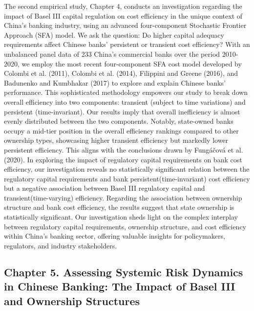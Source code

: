 \documentclass[
  12pt,
  a4paper,
]{scrreprt}
\begin{document}
The second empirical study, Chapter 4, conducts an investigation
regarding the impact of Basel III capital regulation on cost efficiency
in the unique context of China's banking industry, using an advanced
four-component Stochastic Frontier Approach (SFA) model. We ask the
question: Do higher capital adequacy requirements affect Chinese banks'
persistent or transient cost efficiency? With an unbalanced panel data
of 233 China's commercial banks over the period 2010-2020, we employ the
most recent four-component SFA cost model developed by Colombi et al.
(2011), Colombi et al. (2014), Filippini and Greene (2016), and
Badunenko and Kumbhakar (2017) to explore and explain Chinese banks'
performance. This sophisticated methodology empowers our study to break
down overall efficiency into two components: transient (subject to time
variations) and persistent (time-invariant). Our results imply that
overall inefficiency is almost evenly distributed between the two
components. Notably, state-owned banks occupy a mid-tier position in the
overall efficiency rankings compared to other ownership types,
showcasing higher transient efficiency but markedly lower persistent
efficiency. This aligns with the conclusions drawn by Fungáčová et al.
(2020). In exploring the impact of regulatory capital requirements on
bank cost efficiency, our investigation reveals no statistically
significant relation between the regulatory capital requirements and
bank persistent(time-invariant) cost efficiency but a negative
association between Basel III regulatory capital and
transient(time-varying) efficiency. Regarding the association between
ownership structure and bank cost efficiency, the results suggest that
state ownership is statistically significant. Our investigation sheds
light on the complex interplay between regulatory capital requirements,
ownership structure, and cost efficiency within China's banking sector,
offering valuable insights for policymakers, regulators, and industry
stakeholders.

\subsection{Chapter 5. Assessing Systemic Risk Dynamics in Chinese
Banking: The Impact of Basel III and Ownership
Structures}\label{chapter-5.-assessing-systemic-risk-dynamics-in-chinese-banking-the-impact-of-basel-iii-and-ownership-structures}
\end{document}
